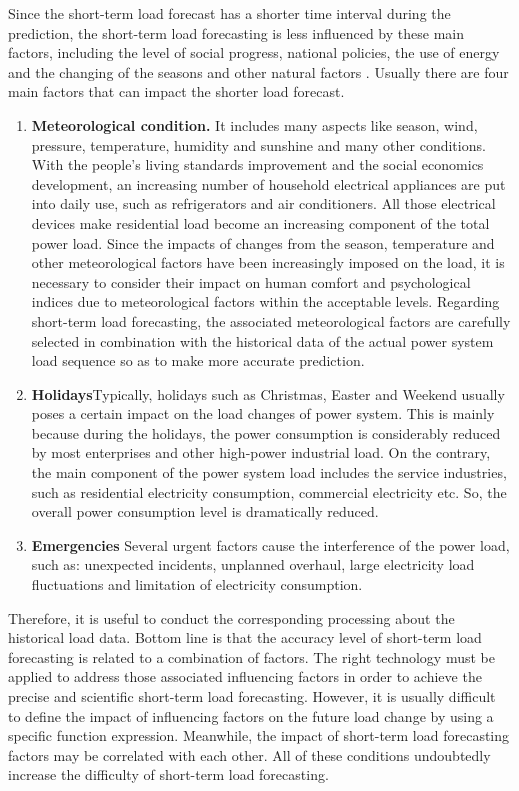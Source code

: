 \par 
Since the short-term load forecast has a shorter time interval during the prediction, the short-term load forecasting is less influenced by these main factors, including the level of social progress, national policies, the use of energy and the changing of the seasons and other natural factors \cite{hahn2009electric}. Usually there are four main factors that can impact the shorter load forecast.
\begin{enumerate}
    \item \textbf{Meteorological condition.} It includes many aspects like season, wind, pressure, temperature, humidity and sunshine and many other conditions. With the people's living standards improvement and the social economics development, an increasing number of household electrical appliances are put into daily use, such as refrigerators and air conditioners. All those electrical devices make residential load become an increasing component of the total power load. Since the impacts of changes from the season, temperature and other meteorological factors have been increasingly imposed on the load, it is necessary to consider their impact on human comfort and psychological indices due to meteorological factors within the acceptable levels. Regarding short-term load forecasting, the associated meteorological factors are carefully selected in combination with the historical data of the actual power system load sequence so as to make more accurate prediction.
\item \textbf{Holidays}Typically, holidays such as Christmas, Easter and Weekend usually poses a certain impact on the load changes of power system. This is mainly because during the holidays, the power consumption is considerably reduced by most enterprises and other high-power industrial load. On the contrary, the main component of the power system load includes the service industries, such as residential electricity consumption, commercial electricity etc. So, the overall power consumption level is dramatically reduced.
\item \textbf{Emergencies} Several urgent factors cause the interference of the power load, such as: unexpected incidents, unplanned overhaul, large electricity load fluctuations and limitation of electricity consumption.
\end{enumerate}
\par Therefore, it is useful to conduct the corresponding processing about the historical load data. Bottom line is that the accuracy level of short-term load forecasting is related to a combination of factors. The right technology must be applied to address those associated influencing factors in order to achieve the precise and scientific short-term load forecasting. However, it is usually difficult to define the impact of influencing factors on the future load change by using a specific function expression. Meanwhile, the impact of short-term load forecasting factors may be correlated with each other. All of these conditions undoubtedly increase the difficulty of short-term load forecasting.

